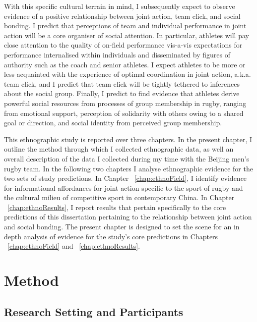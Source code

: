 \begin{CJK}{UTF8}{gbsn}
With this specific cultural terrain in mind, I subsequently expect to observe evidence of a positive relationship between joint action, team click, and social bonding.  I predict that perceptions of team and individual performance in joint action will be a core organiser of social attention.  In particular, athletes will pay close attention to
the quality of on-field performance vis-a-vis expectations for performance internalised within individuals and disseminated by figures of authority such as the coach and senior athletes.  I expect athletes to be more or less acquainted with the experience of optimal coordination in joint action, a.k.a. team click, and I predict that team click will be tightly tethered to inferences about the social group.  Finally, I predict to find evidence that athletes derive powerful social resources from processes of group membership in rugby, ranging from emotional support, perception of solidarity with others owing to a shared goal or direction, and social identity from perceived group membership.


This ethnographic study is reported over three chapters.  In the present chapter, I outline the method through which I collected ethnographic data, as well an overall description of the data I collected during my time with the Beijing men's rugby team.  In the following two chapters I analyse ethnographic evidence for the two sets of study predictions.  In Chapter ~\ref{chap:ethnoField}, I identify evidence for informational affordances for joint action specific to the sport of rugby and the cultural milieu of competitive sport in contemporary China.  In Chapter ~\ref{chap:ethnoResults}, I report results that pertain specifically to the core predictions of this dissertation pertaining to the relationship between joint action and social bonding.  The present chapter is designed to set the scene for an in depth analysis of evidence for the study's core predictions in Chapters ~\ref{chap:ethnoField} and ~\ref{chap:ethnoResults}.


\section{Method}


\subsection{Research Setting and Participants}


\end{CJK}
